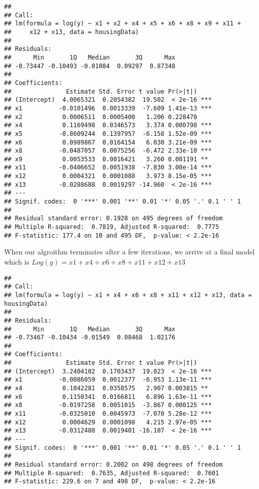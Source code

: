 \documentclass[]{article}
\begin{document}
\begin{verbatim}
## 
## Call:
## lm(formula = log(y) ~ x1 + x2 + x4 + x5 + x6 + x8 + x9 + x11 + 
##     x12 + x13, data = housingData)
## 
## Residuals:
##      Min       1Q   Median       3Q      Max 
## -0.73447 -0.10493 -0.01084  0.09297  0.87348 
## 
## Coefficients:
##               Estimate Std. Error t value Pr(>|t|)    
## (Intercept)  4.0065321  0.2054382  19.502  < 2e-16 ***
## x1          -0.0101496  0.0013339  -7.609 1.41e-13 ***
## x2           0.0006511  0.0005400   1.206 0.228470    
## x4           0.1169498  0.0346573   3.374 0.000798 ***
## x5          -0.8609244  0.1397957  -6.158 1.52e-09 ***
## x6           0.0989867  0.0164154   6.030 3.21e-09 ***
## x8          -0.0487057  0.0075256  -6.472 2.33e-10 ***
## x9           0.0053533  0.0016421   3.260 0.001191 ** 
## x11         -0.0406652  0.0051938  -7.830 3.00e-14 ***
## x12          0.0004321  0.0001088   3.973 8.15e-05 ***
## x13         -0.0288688  0.0019297 -14.960  < 2e-16 ***
## ---
## Signif. codes:  0 '***' 0.001 '**' 0.01 '*' 0.05 '.' 0.1 ' ' 1
## 
## Residual standard error: 0.1928 on 495 degrees of freedom
## Multiple R-squared:  0.7819, Adjusted R-squared:  0.7775 
## F-statistic: 177.4 on 10 and 495 DF,  p-value: < 2.2e-16
\end{verbatim}

When our algroithm terminates after a few iterations, we arrive at a
final model which is \(Log(y) = x1 +x4 + x6 +x8 +x11 +x12 +x13\)

\begin{verbatim}
## 
## Call:
## lm(formula = log(y) ~ x1 + x4 + x6 + x8 + x11 + x12 + x13, data = housingData)
## 
## Residuals:
##      Min       1Q   Median       3Q      Max 
## -0.73467 -0.10434 -0.01549  0.08468  1.02176 
## 
## Coefficients:
##               Estimate Std. Error t value Pr(>|t|)    
## (Intercept)  3.2404102  0.1703437  19.023  < 2e-16 ***
## x1          -0.0086059  0.0012377  -6.953 1.13e-11 ***
## x4           0.1042281  0.0358575   2.907 0.003815 ** 
## x6           0.1150341  0.0166811   6.896 1.63e-11 ***
## x8          -0.0197258  0.0051015  -3.867 0.000125 ***
## x11         -0.0325010  0.0045973  -7.070 5.28e-12 ***
## x12          0.0004629  0.0001098   4.215 2.97e-05 ***
## x13         -0.0312488  0.0019401 -16.107  < 2e-16 ***
## ---
## Signif. codes:  0 '***' 0.001 '**' 0.01 '*' 0.05 '.' 0.1 ' ' 1
## 
## Residual standard error: 0.2002 on 498 degrees of freedom
## Multiple R-squared:  0.7635, Adjusted R-squared:  0.7601 
## F-statistic: 229.6 on 7 and 498 DF,  p-value: < 2.2e-16
\end{verbatim}
\end{document}
